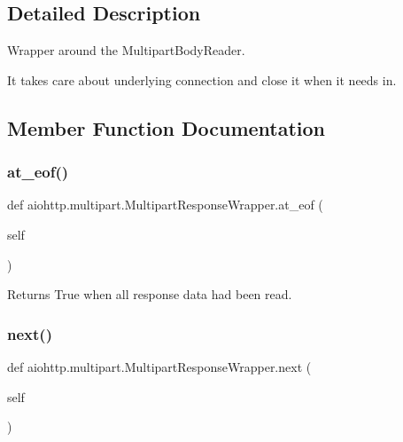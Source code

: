 \subsection{Detailed Description}
\begin{DoxyVerb}Wrapper around the MultipartBodyReader.

It takes care about
underlying connection and close it when it needs in.
\end{DoxyVerb}
 

\subsection{Member Function Documentation}
\mbox{\label{classaiohttp_1_1multipart_1_1_multipart_response_wrapper_af86234292ee8ba0be29210b08f3b1126}} 
\subsubsection{\texorpdfstring{at\+\_\+eof()}{at\_eof()}}
{\footnotesize\ttfamily def aiohttp.\+multipart.\+Multipart\+Response\+Wrapper.\+at\+\_\+eof (\begin{DoxyParamCaption}\item[{}]{self }\end{DoxyParamCaption})}

\begin{DoxyVerb}Returns True when all response data had been read.\end{DoxyVerb}
 \mbox{\label{classaiohttp_1_1multipart_1_1_multipart_response_wrapper_ae70d44e747019ec003377347bfd09740}} 
\subsubsection{\texorpdfstring{next()}{next()}}
{\footnotesize\ttfamily def aiohttp.\+multipart.\+Multipart\+Response\+Wrapper.\+next (\begin{DoxyParamCaption}\item[{}]{self }\end{DoxyParamCaption})}

